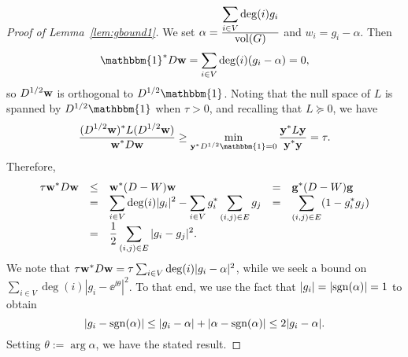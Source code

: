 \begin{proof}[Proof of Lemma~\ref{lem:gbound1}]
We set $\alpha = \frac{\displaystyle \sum_{i \in V} \deg(i) g_i}{\displaystyle \mathrm{vol}(G)}$ and $w_i = g_i - \alpha$.  Then \[\mathbbm{1}^* D {\bf w} = \sum_{i \in V} \deg(i)(g_i - \alpha) = 0,\] so $D^{1/2}{\bf w}$ is orthogonal to $ D^{1/2}\mathbbm{1}$.  Noting that the null space of $L$ is spanned by $D^{1/2}\mathbbm{1}$ when $\tau > 0$, and recalling that $L \succeq 0$, we have \[\bigfrac{(D^{1/2}{\bf w})^* L (D^{1/2} {\bf w})}{{\bf w}^* D {\bf w}} \ge \min_{ \y^*D^{1/2}\mathbbm{1}=0} \bigfrac{\y^* L \y}{\y^* \y} = \tau.\]  Therefore, \[\everymath{\displaystyle} 
\begin{array}{rclcl}%
\tau {\bf w}^* D {\bf w} & \le&  {\bf w}^*(D - W) {\bf w} & = & {\bf g}^*(D - W) {\bf g}  \\
 & = & \sum_{i \in V} \deg(i) |g_i|^2 - \sum_{i \in V} g_i^* \sum_{(i,j) \in E}  g_j & = & \sum_{(i,j) \in E} (1 - g _i^* g_j) \\
 & = & \frac{1}{2} \sum_{(i, j) \in E} |g_i - g_j|^2.%
\end{array}\]%
We note that $\tau {\bf w}^* D {\bf w} = \tau \sum_{i \in V}\deg(i)|g_i - \alpha|^2$, while we seek a bound on $\sum_{i \in V} \deg(i) |g_i - \ee^{\ii \theta}|^2$.  To that end, we use the fact that $|g_i| = |\mathrm{sgn}(\alpha)| = 1$ to obtain $$|g_i - \mathrm{sgn}(\alpha)| \le |g_i - \alpha| + |\alpha - \mathrm{sgn}(\alpha)| \le 2|g_i - \alpha|.$$   Setting $\theta := \arg{\alpha}$, we have the stated result.
\end{proof}

